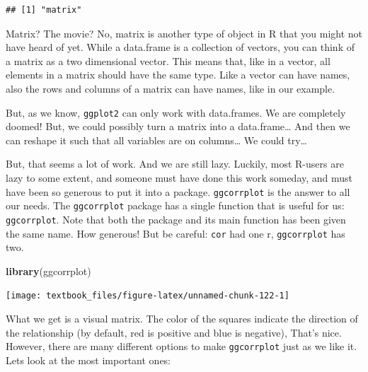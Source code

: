 \documentclass[]{tufte-book}
\newenvironment{Shaded}{}{}
\newcommand{\KeywordTok}[1]{\textcolor[rgb]{0.00,0.44,0.13}{\textbf{#1}}}
\newcommand{\NormalTok}[1]{#1}
\newcommand{\OperatorTok}[1]{\textcolor[rgb]{0.40,0.40,0.40}{#1}}
\newcommand{\StringTok}[1]{\textcolor[rgb]{0.25,0.44,0.63}{#1}}
\begin{document}
\begin{verbatim}
## [1] "matrix"
\end{verbatim}

Matrix? The movie? No, matrix is another type of object in R that you might not have heard of yet. While a data.frame is a collection of vectors, you can think of a matrix as a two dimensional vector. This means that, like in a vector, all elements in a matrix should have the same type. Like a vector can have names, also the rows and columns of a matrix can have names, like in our example.

But, as we know, \texttt{ggplot2} can only work with data.frames. We are completely doomed! But, we could possibly turn a matrix into a data.frame\ldots{} And then we can reshape it such that all variables are on columns\ldots{} We could try\ldots{}

But, that seems a lot of work. And we are still lazy. Luckily, most R-users are lazy to some extent, and someone must have done this work someday, and must have been so generous to put it into a package. \texttt{ggcorrplot} is the answer to all our needs. The \texttt{ggcorrplot} package has a single function that is useful for us: \texttt{ggcorrplot}. Note that both the package and its main function has been given the same name. How generous! But be careful: \texttt{cor} had one r, \texttt{ggcorrplot} has two.

\begin{Shaded}
\begin{Highlighting}[]
\KeywordTok{library}\NormalTok{(ggcorrplot)}
\end{Highlighting}
\end{Shaded}

\begin{Shaded}
\end{Shaded}

\texttt{[image: textbook\_files/figure-latex/unnamed-chunk-122-1]}

What we get is a visual matrix. The color of the squares indicate the direction of the relationship (by default, red is positive and blue is negative), That's nice. However, there are many different options to make \texttt{ggcorrplot} just as we like it. Lets look at the most important ones:
\end{document}
